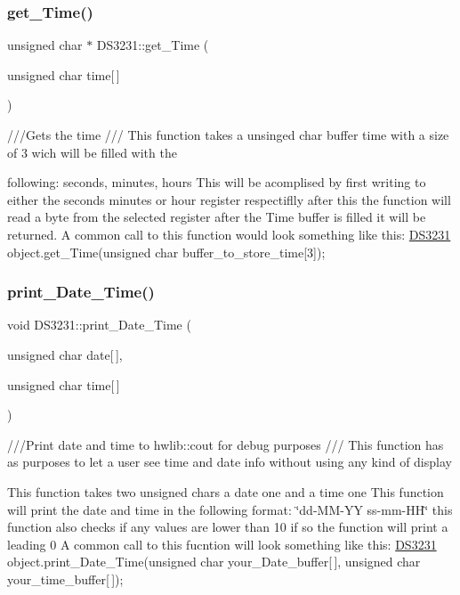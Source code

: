 \subsubsection{\texorpdfstring{get\+\_\+\+Time()}{get\_Time()}}
{\footnotesize\ttfamily unsigned char $\ast$ D\+S3231\+::get\+\_\+\+Time (\begin{DoxyParamCaption}\item[{unsigned char}]{time\mbox{[}$\,$\mbox{]} }\end{DoxyParamCaption})}



///\+Gets the time  /// This function takes a unsinged char buffer time with a size of 3 wich will be filled with the 

following\+: seconds, minutes, hours This will be acomplised by first writing to either the seconds minutes or hour register respectiflly after this the function will read a byte from the selected register after the Time buffer is filled it will be returned. A common call to this function would look something like this\+: \hyperlink{classDS3231}{D\+S3231} object.\+get\+\_\+\+Time(unsigned char buffer\+\_\+to\+\_\+store\+\_\+time\mbox{[}3\mbox{]}); \mbox{\label{classDS3231_aeab337c5de40bcebaf6aa3e856d43e69}} 
\subsubsection{\texorpdfstring{print\+\_\+\+Date\+\_\+\+Time()}{print\_Date\_Time()}}
{\footnotesize\ttfamily void D\+S3231\+::print\+\_\+\+Date\+\_\+\+Time (\begin{DoxyParamCaption}\item[{unsigned char}]{date\mbox{[}$\,$\mbox{]},  }\item[{unsigned char}]{time\mbox{[}$\,$\mbox{]} }\end{DoxyParamCaption})}



///\+Print date and time to hwlib\+::cout for debug purposes  /// This function has as purposes to let a user see time and date info without using any kind of display 

This function takes two unsigned chars a date one and a time one This function will print the date and time in the following format\+: \char`\"{}dd-\/\+M\+M-\/\+Y\+Y ss-\/mm-\/\+H\+H\char`\"{} this function also checks if any values are lower than 10 if so the function will print a leading 0 A common call to this fucntion will look something like this\+: \hyperlink{classDS3231}{D\+S3231} object.\+print\+\_\+\+Date\+\_\+\+Time(unsigned char your\+\_\+\+Date\+\_\+buffer\mbox{[}$\,$\mbox{]}, unsigned char your\+\_\+time\+\_\+buffer\mbox{[}$\,$\mbox{]}); \mbox{\label{classDS3231_a9c7b9495c68607c0666006f318e9afca}} 

